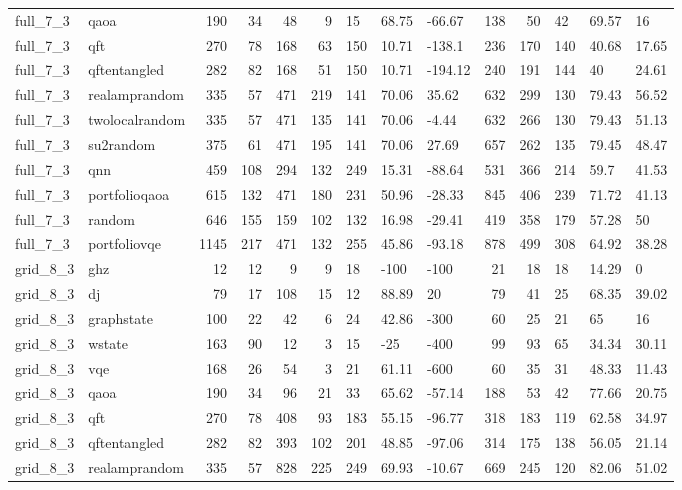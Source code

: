 \begin{longtable}{llrrrrlllrrlll}
full\_7\_3 & qaoa & 190 & 34 & 48 & 9 & 15 & 68.75 & -66.67 & 138 & 50 & 42 & 69.57 & 16 \\
full\_7\_3 & qft & 270 & 78 & 168 & 63 & 150 & 10.71 & -138.1 & 236 & 170 & 140 & 40.68 & 17.65 \\
full\_7\_3 & qftentangled & 282 & 82 & 168 & 51 & 150 & 10.71 & -194.12 & 240 & 191 & 144 & 40 & 24.61 \\
full\_7\_3 & realamprandom & 335 & 57 & 471 & 219 & 141 & 70.06 & 35.62 & 632 & 299 & 130 & 79.43 & 56.52 \\
full\_7\_3 & twolocalrandom & 335 & 57 & 471 & 135 & 141 & 70.06 & -4.44 & 632 & 266 & 130 & 79.43 & 51.13 \\
full\_7\_3 & su2random & 375 & 61 & 471 & 195 & 141 & 70.06 & 27.69 & 657 & 262 & 135 & 79.45 & 48.47 \\
full\_7\_3 & qnn & 459 & 108 & 294 & 132 & 249 & 15.31 & -88.64 & 531 & 366 & 214 & 59.7 & 41.53 \\
full\_7\_3 & portfolioqaoa & 615 & 132 & 471 & 180 & 231 & 50.96 & -28.33 & 845 & 406 & 239 & 71.72 & 41.13 \\
full\_7\_3 & random & 646 & 155 & 159 & 102 & 132 & 16.98 & -29.41 & 419 & 358 & 179 & 57.28 & 50 \\
full\_7\_3 & portfoliovqe & 1145 & 217 & 471 & 132 & 255 & 45.86 & -93.18 & 878 & 499 & 308 & 64.92 & 38.28 \\
grid\_8\_3 & ghz & 12 & 12 & 9 & 9 & 18 & -100 & -100 & 21 & 18 & 18 & 14.29 & 0 \\
grid\_8\_3 & dj & 79 & 17 & 108 & 15 & 12 & 88.89 & 20 & 79 & 41 & 25 & 68.35 & 39.02 \\
grid\_8\_3 & graphstate & 100 & 22 & 42 & 6 & 24 & 42.86 & -300 & 60 & 25 & 21 & 65 & 16 \\
grid\_8\_3 & wstate & 163 & 90 & 12 & 3 & 15 & -25 & -400 & 99 & 93 & 65 & 34.34 & 30.11 \\
grid\_8\_3 & vqe & 168 & 26 & 54 & 3 & 21 & 61.11 & -600 & 60 & 35 & 31 & 48.33 & 11.43 \\
grid\_8\_3 & qaoa & 190 & 34 & 96 & 21 & 33 & 65.62 & -57.14 & 188 & 53 & 42 & 77.66 & 20.75 \\
grid\_8\_3 & qft & 270 & 78 & 408 & 93 & 183 & 55.15 & -96.77 & 318 & 183 & 119 & 62.58 & 34.97 \\
grid\_8\_3 & qftentangled & 282 & 82 & 393 & 102 & 201 & 48.85 & -97.06 & 314 & 175 & 138 & 56.05 & 21.14 \\
grid\_8\_3 & realamprandom & 335 & 57 & 828 & 225 & 249 & 69.93 & -10.67 & 669 & 245 & 120 & 82.06 & 51.02 \\

\end{longtable}
